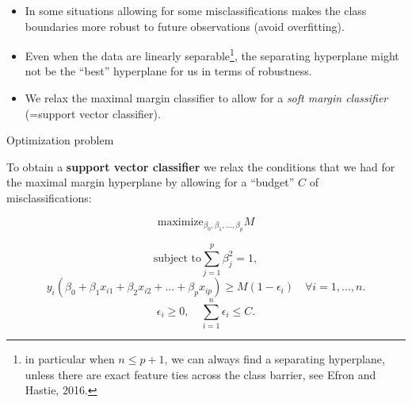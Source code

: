 \documentclass[10pt,ignorenonframetext,]{beamer}
\begin{document}
\begin{frame}

\begin{itemize}
\item
  In some situations allowing for some misclassifications makes the
  class boundaries more robust to future observations (avoid
  overfitting).
\item
  Even when the data are linearly
  separable\footnote{in particular when $n\leq p+1$, we can always find a separating hyperplane, unless there are exact feature ties across the class barrier, see Efron and Hastie, 2016.},
  the separating hyperplane might not be the ``best'' hyperplane for us
  in terms of robustness.
\item
  We relax the maximal margin classifier to allow for a \emph{soft
  margin classifier} (=support vector classifier).
\end{itemize}

\end{frame}

\begin{frame}

\begin{block}{Optimization problem}

\vspace{2mm}

To obtain a \textbf{support vector classifier} we relax the conditions
that we had for the maximal margin hyperplane by allowing for a
``budget'' \(C\) of misclassifications: \vspace{2mm}

\[\mathrm{maximize}_{\beta_0,\beta_1,...,\beta_p}  M \]

\[\text{subject to} \sum_{j=1}^p \beta_j^2=1,\]
\[y_i(\beta_0+\beta_1 x_{i1}+\beta_2 x_{i2}+...+\beta_p x_{ip})\geq M(1-\epsilon_i) \quad  \forall i=1,...,n.\]
\[\epsilon_i\geq 0, \quad \sum_{i=1}^n \epsilon_i \leq C.\]

\end{block}

\end{frame}
\end{document}
